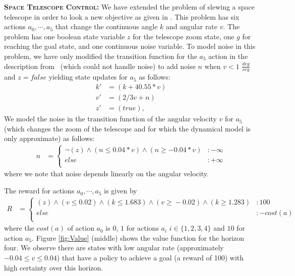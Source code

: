 \documentclass[letterpaper]{article}
\begin{document}
{\bf \textsc{Space Telescope Control}:} We have extended the problem
of slewing a space telescope in order to look a new objective as given
in \cite{DLohr:2012}. This problem has six actions $a_0, \cdots ,a_5$
that change the continuous angle $k$ and angular rate $v$.  The
problem has one boolean state variable $z$ for the telescope zoom
state, one $g$ for reaching the goal state, and one continuous noise
variable.  To model noise in this problem, we have only modified the
transition function for the $a_5$ action in the description
from~\cite{DLohr:2012} (which could not handle noise) to add noise
$n$ when $v < 1$ $\frac{deg}{seg}$ and $z=false$ yielding state
updates for $a_5$ as follows: {\footnotesize
\begin{align*}
k' & =( k + 40.55*v) \\
v'& =(2/3 v + n) \\
z'& =( true ),
\end{align*}}
We model the noise in the transition function of the angular
velocity $v$ for $a_5$ (which changes the zoom of the telescope and for which
the dynamical model is only approximate) as follows:
{\footnotesize
\begin{align*}
n & = \begin{cases}
\neg (z) \wedge (n \leq 0.04*v) \wedge (n \geq -0.04*v) &:-\infty\\
else &: +\infty\\
\end{cases}
\end{align*}}
where we note that noise depends linearly on the angular velocity.

The reward for actions $a_0, \cdots ,a_5$ is given by
{\tiny
\begin{align*}
R & = \begin{cases}
(z) \wedge (v \! \leq \! 0.02) \wedge (k \! \leq \! 1.683) \wedge (v \! \geq \! -0.02) \wedge (k \! \geq \! 1.283) &\!\!:100\\
else &: -\mathit{cost}(a)\\
\end{cases}
\end{align*}}
where the $\mathit{cost}(a)$ of action $a_0$ is 0, $1$ for actions
$a_i$ $i \in \{1,2,3,4\}$ and $10$ for action $a_5$.  
Figure \ref{fig:Value} (middle) shows the value function for the
horizon four. We observe there are states with low angular
rate (approximately $-0.04\leq v \leq 0.04$) that have a policy to
achieve a goal (a reward of 100) with high certainty over this
horizon.
\end{document}
